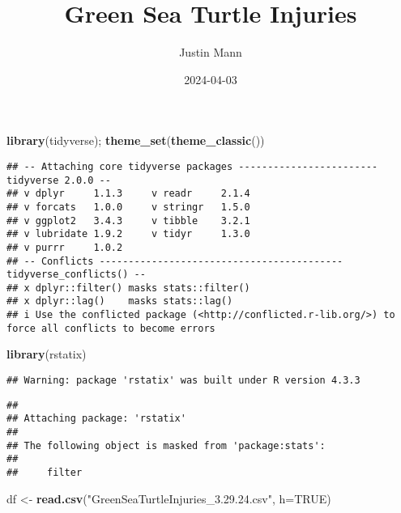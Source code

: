 \documentclass[
]{article}
\title{Green Sea Turtle Injuries}
\author{Justin Mann}
\date{2024-04-03}
\newenvironment{Shaded}{\begin{snugshade}}{\end{snugshade}}
\newcommand{\AttributeTok}[1]{\textcolor[rgb]{0.13,0.29,0.53}{#1}}
\newcommand{\ConstantTok}[1]{\textcolor[rgb]{0.56,0.35,0.01}{#1}}
\newcommand{\FunctionTok}[1]{\textcolor[rgb]{0.13,0.29,0.53}{\textbf{#1}}}
\newcommand{\NormalTok}[1]{#1}
\newcommand{\OtherTok}[1]{\textcolor[rgb]{0.56,0.35,0.01}{#1}}
\newcommand{\SpecialCharTok}[1]{\textcolor[rgb]{0.81,0.36,0.00}{\textbf{#1}}}
\newcommand{\StringTok}[1]{\textcolor[rgb]{0.31,0.60,0.02}{#1}}
\begin{document}
\maketitle

\begin{Shaded}
\begin{Highlighting}[]
\FunctionTok{library}\NormalTok{(tidyverse); }\FunctionTok{theme\_set}\NormalTok{(}\FunctionTok{theme\_classic}\NormalTok{())}
\end{Highlighting}
\end{Shaded}

\begin{verbatim}
## -- Attaching core tidyverse packages ------------------------ tidyverse 2.0.0 --
## v dplyr     1.1.3     v readr     2.1.4
## v forcats   1.0.0     v stringr   1.5.0
## v ggplot2   3.4.3     v tibble    3.2.1
## v lubridate 1.9.2     v tidyr     1.3.0
## v purrr     1.0.2     
## -- Conflicts ------------------------------------------ tidyverse_conflicts() --
## x dplyr::filter() masks stats::filter()
## x dplyr::lag()    masks stats::lag()
## i Use the conflicted package (<http://conflicted.r-lib.org/>) to force all conflicts to become errors
\end{verbatim}

\begin{Shaded}
\begin{Highlighting}[]
\FunctionTok{library}\NormalTok{(rstatix)}
\end{Highlighting}
\end{Shaded}

\begin{verbatim}
## Warning: package 'rstatix' was built under R version 4.3.3
\end{verbatim}

\begin{verbatim}
## 
## Attaching package: 'rstatix'
## 
## The following object is masked from 'package:stats':
## 
##     filter
\end{verbatim}

\begin{Shaded}
\begin{Highlighting}[]
\NormalTok{df }\OtherTok{\textless{}{-}} \FunctionTok{read.csv}\NormalTok{(}\StringTok{"GreenSeaTurtleInjuries\_3.29.24.csv"}\NormalTok{, }\AttributeTok{h=}\ConstantTok{TRUE}\NormalTok{)}
\end{Highlighting}
\end{Shaded}

\begin{Shaded}
\end{Shaded}
\end{document}
